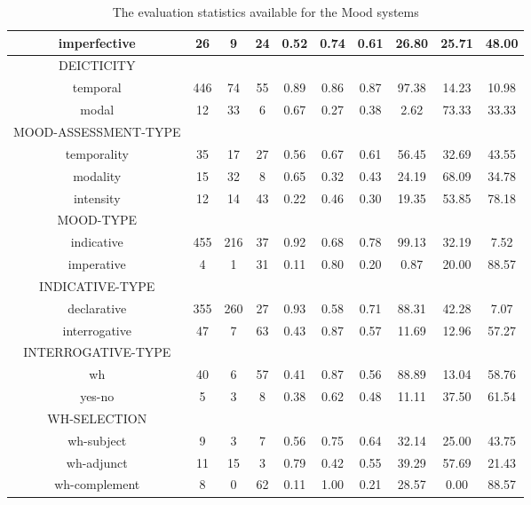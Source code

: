 \begin{table}[!ht]
{\begin{tabular}{|c|c|c|c|c|c|c|c|c|c|}
            imperfective & 26  & 9  & 24  & 0.52 & 0.74 & 0.61 & 26.80 & 25.71 & 48.00 \\ \hline
            DEICTICITY &  &  &  &  &  &  &  &  &  \\ \hline            
            temporal & 446 & 74 & 55 & 0.89 & 0.86 & 0.87 & 97.38 & 14.23 & 10.98 \\ \hline
            modal    & 12  & 33 & 6  & 0.67 & 0.27 & 0.38 & 2.62  & 73.33 & 33.33 \\ \hline
            MOOD-ASSESSMENT-TYPE  &  &  &  &  &  &  &  &  &  \\ \hline            
            temporality & 35 & 17 & 27 & 0.56 & 0.67 & 0.61 & 56.45 & 32.69 & 43.55 \\ \hline
            modality    & 15 & 32 & 8  & 0.65 & 0.32 & 0.43 & 24.19 & 68.09 & 34.78 \\ \hline
            intensity   & 12 & 14 & 43 & 0.22 & 0.46 & 0.30 & 19.35 & 53.85 & 78.18 \\ \hline
            MOOD-TYPE  &  &  &  &  &  &  &  &  &  \\ \hline                        
            indicative    & 455 & 216 & 37 & 0.92 & 0.68 & 0.78 & 99.13 & 32.19 & 7.52  \\ \hline
            imperative    & 4   & 1   & 31 & 0.11 & 0.80 & 0.20 & 0.87  & 20.00 & 88.57 \\ \hline
            INDICATIVE-TYPE  &  &  &  &  &  &  &  &  &  \\ \hline                        
            declarative   & 355 & 260 & 27 & 0.93 & 0.58 & 0.71 & 88.31 & 42.28 & 7.07  \\ \hline
            interrogative & 47  & 7   & 63 & 0.43 & 0.87 & 0.57 & 11.69 & 12.96 & 57.27 \\ \hline
            INTERROGATIVE-TYPE  &  &  &  &  &  &  &  &  &  \\ \hline   
            wh            & 40  & 6   & 57 & 0.41 & 0.87 & 0.56 & 88.89 & 13.04 & 58.76 \\ \hline
            yes-no        & 5   & 3   & 8  & 0.38 & 0.62 & 0.48 & 11.11 & 37.50 & 61.54 \\ \hline                     
            WH-SELECTION  &  &  &  &  &  &  &  &  &  \\ \hline                        
            wh-subject    & 9   & 3   & 7  & 0.56 & 0.75 & 0.64 & 32.14 & 25.00 & 43.75 \\ \hline
            wh-adjunct    & 11  & 15  & 3  & 0.79 & 0.42 & 0.55 & 39.29 & 57.69 & 21.43 \\ \hline
            wh-complement & 8   & 0   & 62 & 0.11 & 1.00 & 0.21 & 28.57 & 0.00  & 88.57 \\ \hline
        \end{tabular}
    }
    \caption{The evaluation statistics available for the Mood systems}
    \label{tab:features-mood}
\end{table}

